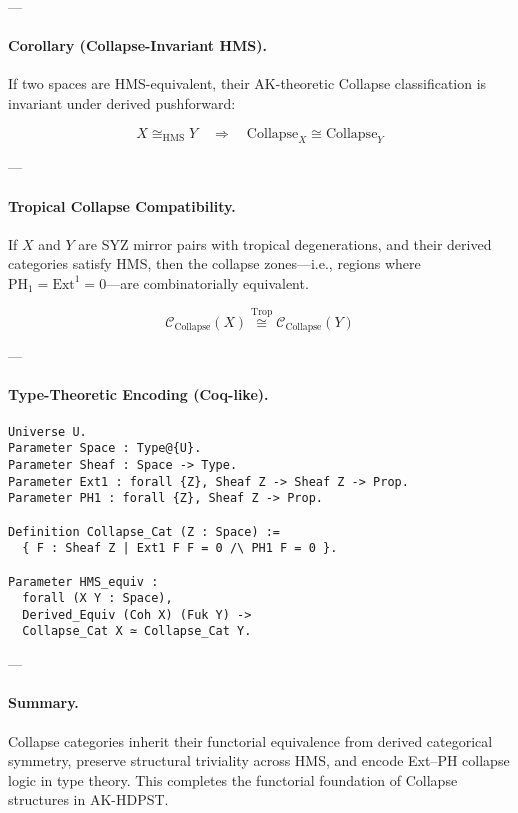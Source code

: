 \documentclass[11pt]{article}
\begin{document}
\begin{axiom}
\begin{axiom}
{{---

\paragraph{Corollary (Collapse-Invariant HMS).}

If two spaces are HMS-equivalent, their AK-theoretic Collapse classification is invariant under derived pushforward:

\[
X \cong_{\mathrm{HMS}} Y \quad \Longrightarrow \quad \mathrm{Collapse}_X \cong \mathrm{Collapse}_Y
\]

---

\paragraph{Tropical Collapse Compatibility.}

If \( X \) and \( Y \) are SYZ mirror pairs with tropical degenerations,  
and their derived categories satisfy HMS, then the collapse zones—i.e.,  
regions where \( \mathrm{PH}_1 = \mathrm{Ext}^1 = 0 \)—are combinatorially equivalent.

\[
\mathcal{C}_{\text{Collapse}}(X) \overset{\mathrm{Trop}}{\cong} \mathcal{C}_{\text{Collapse}}(Y)
\]

---

\paragraph{Type-Theoretic Encoding (Coq-like).}

\begin{lstlisting}[language=Coq, caption=Collapse Functor Equivalence in Type Theory]
Universe U.
Parameter Space : Type@{U}.
Parameter Sheaf : Space -> Type.
Parameter Ext1 : forall {Z}, Sheaf Z -> Sheaf Z -> Prop.
Parameter PH1 : forall {Z}, Sheaf Z -> Prop.

Definition Collapse_Cat (Z : Space) :=
  { F : Sheaf Z | Ext1 F F = 0 /\ PH1 F = 0 }.

Parameter HMS_equiv :
  forall (X Y : Space),
  Derived_Equiv (Coh X) (Fuk Y) ->
  Collapse_Cat X ≃ Collapse_Cat Y.
\end{lstlisting}

---

\paragraph{Summary.}

Collapse categories inherit their functorial equivalence from derived categorical symmetry,  
preserve structural triviality across HMS, and encode Ext–PH collapse logic in type theory.  
This completes the functorial foundation of Collapse structures in AK-HDPST.

}}
\end{axiom}
\end{axiom}
\end{document}
